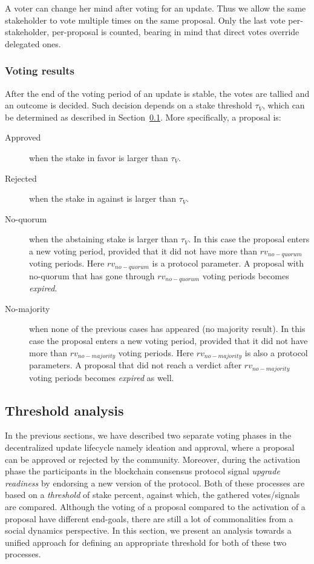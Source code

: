 \documentclass[11pt,a4paper]{article}
\begin{document}
A voter can change her mind after voting for an update. Thus we allow the same
stakeholder to vote multiple times on the same proposal. Only the last vote
per-stakeholder, per-proposal is counted, bearing in mind that direct votes
override delegated ones.

\subsubsection{Voting results}
\label{sec:voting-results}

After the end of the voting period of an update is stable, the votes are tallied
and an outcome is decided.
%
Such decision depends on a stake threshold $\tau_V$, which can be determined as
described in Section~\ref{sec:threshold-analysis}. More specifically, a proposal
is:
\begin{description}
\item[Approved] when the stake in favor is larger than $\tau_V$.
\item[Rejected] when the stake in against is larger than $\tau_V$.
\item[No-quorum] when the abstaining stake is larger than $\tau_V$. In this
  case the proposal enters a new voting period, provided that it did not
  have more than $rv_{no-quorum}$ voting periods. Here $rv_{no-quorum}$ is a
  protocol parameter. A proposal with no-quorum that has gone through
  $rv_{no-quorum}$ voting periods becomes \emph{expired}.
\item[No-majority] when none of the previous cases has appeared (no majority
  result). In this case the proposal enters a new voting period, provided that
  it did not have more than $rv_{no-majority}$ voting periods. Here
  $rv_{no-majority}$ is also a protocol parameters. A proposal that did not
  reach a verdict after $rv_{no-majority}$ voting periods becomes \emph{expired}
  as well.
\end{description}

\subsection{Threshold analysis}
\label{sec:threshold-analysis}

In the previous sections, we have described two separate voting phases in the
decentralized update lifecycle
namely ideation and approval, where a proposal can be approved or rejected by
the community.
%
Moreover, during the activation phase the participants in the blockchain
consensus protocol signal \emph{upgrade readiness} by endorsing a new version
of the protocol. Both of these processes are based on a \emph{threshold} of
stake percent, against which, the gathered votes/signals are compared.
%
Although the voting of a proposal compared to the activation of a proposal have
different end-goals, there are still a lot of commonalities from a social
dynamics perspective. In this section, we present an analysis towards a unified
approach for defining an appropriate threshold for both of these two processes.
\end{document}
